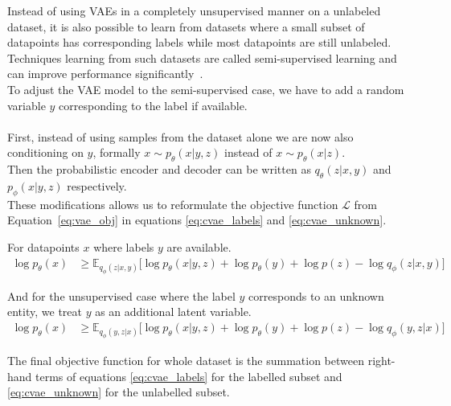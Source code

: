 Instead of using VAEs in a completely unsupervised manner on a unlabeled dataset, it is also possible to learn from datasets where a small subset of datapoints has corresponding labels while most datapoints are still unlabeled.
Techniques learning from such datasets are called semi-supervised learning and can improve performance significantly~\cite{cvae:2014}\cite{cvae_2:2015}.\\
%
To adjust the VAE model to the semi-supervised case, we have to add a random variable $y$ corresponding to the label if available.\\\\
First, instead of using samples from the dataset alone we are now also conditioning on $y$, formally 
$x \sim p_\theta(x|y,z)$ instead of $x \sim p_\theta(x|z)$.\\
Then the probabilistic encoder and decoder can be written as $q_\theta(z|x,y)$ and $p_\phi(x|y,z)$ respectively.\\
%
%
%
%
%
These modifications allows us to reformulate the objective function $\mathcal{L}$ from Equation~\ref{eq:vae_obj} in equations \ref{eq:cvae_labels} and \ref{eq:cvae_unknown}.

For datapoints $x$ where labels $y$ are available.
\begin{align}
  \label{eq:cvae_labels}
  \log p_\theta(x) &\geq \mathbb{E}_{q_\phi(z|x,y)} \bigg[\log p_\theta(x|y,z) + \log p_\theta(y) + \log p(z) - \log q_\phi(z|x,y)\bigg]
\end{align}

And for the unsupervised case where the label $y$ corresponds to an unknown entity, we treat $y$ as an additional latent variable.
\begin{align}
  \label{eq:cvae_unknown}
  \log p_\theta(x) &\geq \mathbb{E}_{q_\phi(y,z|x)} \bigg[\log p_\theta(x|y,z) + \log p_\theta(y) + \log p(z) - \log q_\phi(y,z|x)\bigg]
\end{align}

The final objective function for whole dataset is the summation between right-hand terms of equations \ref{eq:cvae_labels} for the labelled subset and \ref{eq:cvae_unknown} for the unlabelled subset.
